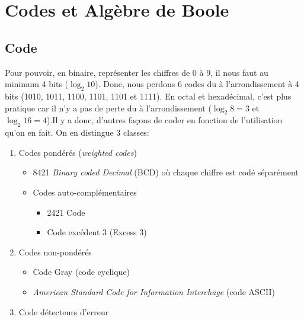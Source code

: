 \chapter{Codes et Algèbre de Boole}
\section{Code}
Pour pouvoir, en binaire, représenter les chiffres de 0 à 9, il nous faut au minimum 4 bits ($\log_2 10$). Donc, nous perdons 6 codes du à l'arrondissement à 4 bits (1010, 1011, 1100, 1101, 1101 et 1111). En octal et hexadécimal, c'est plus pratique car il n'y a pas de perte du à l'arrondissement ($\log_2 8=3$ et $\log_2 16=4$).Il y a donc, d'autres façons de coder en fonction de l'utilisation qu'on en fait. On en distingue 3 classes: 
\begin{enumerate}
	\item 	Codes pondérés (\textit{weighted codes})
	\begin{itemize}
		\item 8421 \textit{Binary coded Decimal} (BCD) où chaque chiffre est codé séparément
		\item Codes auto-complémentaires
		\begin{itemize}
			\item 2421 Code
			\item Code excédent 3 (Excess 3)
		\end{itemize}
	\end{itemize}
	\item Codes non-pondérés
	\begin{itemize}
		\item Code Gray (code cyclique)
		\item \textit{American Standard Code for Information Interchage} (code ASCII)
	\end{itemize}
	\item Code détecteurs d'erreur
\end{enumerate}
